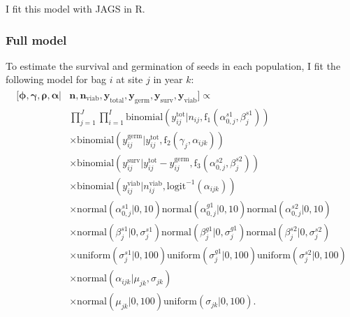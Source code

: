 \documentclass[12pt, oneside, titlepage]{article}   	%
\begin{document}
I fit this model with JAGS in R. %

\subsubsection*{Full model}

To estimate the survival and germination of seeds in each population, I fit the following model for bag $i$ at site $j$ in year $k$:
%
\begin{align}
  \begin{split}
 [ \bm{\phi}, \bm{\gamma}, \bm{\rho}, \bm{\alpha} | & \bm{n}, \bm{n_{\mathrm{viab}}}, \bm{y_{\mathrm{total}}},  \bm{y_{\mathrm{germ}}},  \bm{y_{\mathrm{surv}}}, \bm{y_{\mathrm{viab}}} ] \propto \\
   & \prod_{j=1}^{J} \prod_{i=1}^{I} %
   \mathrm{binomial} ( y^{\mathrm{tot}}_{ij} | n_{ij}, \mathrm{f}_1(\alpha^{s1}_{0,j} , \beta^{s1}_{j} ) ) 
 \\ & \times \mathrm{binomial} ( y^{\mathrm{germ}}_{ij}  | y^{\mathrm{tot}}_{ij}  , \mathrm{f}_2( \gamma_{j} , \alpha_{ijk}) )
 \\ & \times \mathrm{binomial} ( y^{\mathrm{surv}}_{ij} | y^{\mathrm{tot}}_{ij}  -  y^{\mathrm{germ}}_{ij}   , \mathrm{f}_3(\alpha^{s2}_{0,j} , \beta^{s2}_{j} ) ) 
 \\ & \times  \mathrm{binomial} ( y^{\mathrm{viab}}_{ij} | n^{\mathrm{viab}}_{ij}, \mathrm{logit}^{-1}(\alpha_{ijk}) ) 
    \\ & \times \mathrm{normal} ( \alpha^{s1}_{0,j} | 0, 10) \mathrm{normal} ( \alpha^{g1}_{0,j} | 0, 10) \mathrm{normal} ( \alpha^{s2}_{0,j} | 0, 10)  
    \\ & \times \mathrm{normal} ( \beta^{s1}_{j} | 0, \sigma_j^{s1}) \mathrm{normal} ( \beta^{g1}_{j} | 0, \sigma_j^{g1}) \mathrm{normal} ( \beta^{s2}_{j} | 0, \sigma_j^{s2}) 
    \\ & \times \mathrm{uniform} ( \sigma_j^{s1} | 0, 100) \mathrm{uniform} ( \sigma_j^{g1} | 0, 100)  \mathrm{uniform} ( \sigma_j^{s2} | 0, 100)   
  \\ & \times \mathrm{normal} ( \alpha_{ijk}  | \mu_{jk}, \sigma_{jk} )
  \\ & \times \mathrm{normal} ( \mu_{jk} | 0 , 100 ) \mathrm{uniform} ( \sigma_{jk} | 0,100).
  \end{split}
\end{align}
\end{document}
